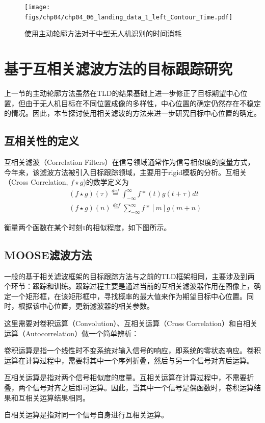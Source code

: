 \begin{figure}[ht]   
	\centering
	\texttt{[image: figs/chp04/chp04\_06\_landing\_data\_1\_left\_Contour\_Time.pdf]}
	\caption{使用主动轮廓方法对于中型无人机识别的时间消耗}
	\label{fig:chp04_06_landing_data_1_left_Contour_Time}
\end{figure}


\section{基于互相关滤波方法的目标跟踪研究}
上一节的主动轮廓方法虽然在TLD的结果基础上进一步修正了目标期望中心位置，但由于无人机目标在不同位置成像的多样性，中心位置的确定仍然存在不稳定的情况。因此，本节探讨使用相关滤波的方法来进一步研究目标中心位置的确定。


\subsection{互相关性的定义}
互相关滤波（Correlation Filters）在信号领域通常作为信号相似度的度量方式，今年来，该滤波方法被引入目标跟踪领域，主要用于rigid模板的分析。互相关（Cross Correlation, $f \star g$)的数学定义为
\begin{align}
&(f \star g)(\tau )\mathop  = \limits^{def} \int_{ - \infty }^\infty  {f*(t)g(t + \tau )dt} \\ 
&(f \star g)(n)\mathop  = \limits^{def} \sum\limits_{ - \infty }^\infty  {f*[m]g(m + n)}
\end{align}

衡量两个函数在某个时刻τ的相似程度，如下图所示。

\subsection{MOOSE滤波方法}
一般的基于相关滤波框架的目标跟踪方法与之前的TLD框架相同，主要涉及到两个环节：跟踪和训练。跟踪过程主要是通过当前的互相关滤波器作用在图像上，确定一个矩形框，在该矩形框中，寻找概率的最大值来作为期望目标中心位置。同时，根据该中心位置，更新滤波器的相关参数。

这里需要对卷积运算（Convolution）、互相关运算（Cross Correlation）和自相关运算（Autocorrelation）做一个简单辨析：
\begin{compactenum}
	\item 卷积运算是指一个线性时不变系统对输入信号的响应，即系统的零状态响应。卷积运算在计算过程中，需要将其中一个序列折叠，然后与另一个信号对齐后运算。
	\item 互相关运算是指对两个信号相似度的度量。互相关运算在计算过程中，不需要折叠，两个信号对齐之后即可运算。因此，当其中一个信号是偶函数时，卷积运算结果和互相关运算结果相同。
	\item 自相关运算是指对同一个信号自身进行互相关运算。
\end{compactenum}

